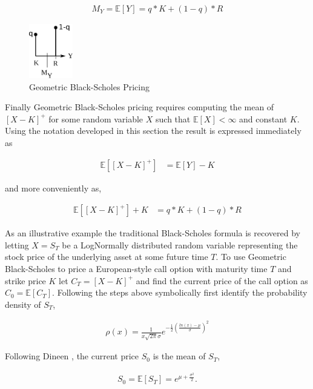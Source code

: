 \begin{align*}
M_Y = \mathbb{E}[Y] = q * K + (1-q) * R
\end{align*}

\begin{figure}
  \centering
  \includegraphics[width=0.75in]{Images/Z_XR_K_discrete.eps}
  \caption[Geometric Black-Scholes Pricing]
          {Geometric Black-Scholes Pricing}
  \label{fig:Z_XR_K_discrete}
\end{figure}

Finally Geometric Black-Scholes pricing requires computing the mean of $[X-K]^+$ for some random variable $X$ such that $\mathbb{E}[X] < \infty$ and constant $K$. Using the notation developed in this section the result is expressed immediately as

\begin{align*}
\mathbb{E}[[X-K]^+] &= \mathbb{E}[Y] - K
\end{align*}

and more conveniently as,

\begin{align*}
\mathbb{E}[[X-K]^+] + K &= q * K + (1-q) * R
\end{align*}

As an illustrative example the traditional Black-Scholes formula is recovered by letting $X = S_T$ be a LogNormally distributed random variable representing the stock price of the underlying asset at some future time $T$. To use Geometric Black-Scholes to price a European-style call option with maturity time $T$ and strike price $K$ let $C_T = [X-K]^+$ and find the current price of the call option as $C_0 = \mathbb{E}[C_T]$. Following the steps above symbolically first identify the probability density of $S_T$,

\begin{align*}
\rho(x) = \frac{1}{x \sqrt{2 \pi} \sigma} e^{-\frac{1}{2}(\frac{ln(x) - \mu}{\sigma})^2}
\end{align*}

Following Dineen \cite{dineen00}, the current price $S_0$ is the mean of $S_T$,

\begin{align*}
S_0 = \mathbb{E}[S_T] = e^{\mu + \frac{\sigma^2}{2}}.
\end{align*}

